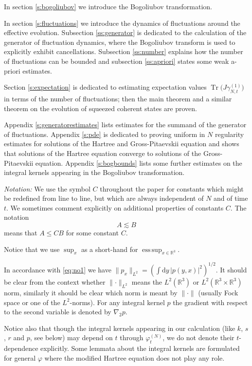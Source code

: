 \documentclass[11pt,a4paper,draft,DIV11]{scrartcl}	%
\newcommand{\di}{\textrm{d}}		%
\newcommand{\Rbb}{\mathbb{R}}		%
\newcommand{\norm}[1]{\lVert#1\rVert}	%
\newcommand{\ph}{\varphi_t^{(N)}}	%
\newcommand{\Tr}{\operatorname{Tr}}	%
\newcommand{\eqr}[1]{\eqref{eq:#1}}			%
\begin{document}
In section \ref{s:bogoliubov} we introduce the Bogoliubov transformation.

In section \ref{s:fluctuations} we introduce the dynamics of fluctuations around the effective evolution. Subsection \ref{ss:generator} is dedicated to the calculation of the generator of fluctuation dynamics, where the Bogoliubov transform is used to explicitly exhibit cancellations. Subsection \ref{ss:number} explains how the number of fluctuations can be bounded and subsection \ref{ss:apriori} states some weak a-priori estimates.

Section \ref{s:expectation} is dedicated to estimating expectation values $\Tr\big(J \gamma_{N,t}^{(1)}\big)$ in terms of the number of fluctuations; then the main theorem and a similar theorem on the evolution of squeezed coherent states are proven.

Appendix \ref{s:generatorestimates} lists estimates for the summand of the generator of fluctuations. Appendix \ref{s:pde} is dedicated to proving uniform in $N$ regularity estimates for solutions of the Hartree and Gross-Pitaevskii equation and shows that solutions of the Hartree equation converge to solutions of the Gross-Pitaevskii equation. Appendix \ref{s:bogbounds} lists some further estimates on the integral kernels appearing in the Bogoliubov transformation.
\newline

\emph{Notation:} We use the symbol $C$ throughout the paper for constants which might be redefined from line to line, but which are always independent of $N$ and of time $t$. We sometimes comment explicitly on additional properties of constants $C$.
The notation
\[
  A \apprle B
\]
means that $A \le C B$ for some constant $C$.

Notice that we use $\sup_x$ as a short-hand for $\operatorname{ess\,sup}_{x\in \Rbb^3}$.

In accordance with \eqr{no1} we have $\norm{p_x}_{L^2} = \left( \int \di y\,
\lvert p(y,x)\rvert^2 \right)^{1/2}$. It should be clear from the context
whether $\norm{\cdot}_{L^2}$ means the $L^2(\Rbb^3)$ or $L^2(\Rbb^3 \times \Rbb^3)$ norm, similarly it should be clear which norm is meant by $\norm{\cdot}$ (usually Fock space or one of the $L^2$-norms).
For any integral kernel $p$ the gradient with respect to the second variable is denoted by $\nabla_2 p$.

Notice also that though the integral kernels appearing in our calculation (like $k$, $s$, $r$ and $p$, see below) may depend on $t$ through $\ph$, we do not denote their $t$-dependence explicitly. Some lemmata about the integral kernels are formulated for general $\varphi$ where the modified Hartree equation does not play any role.
\end{document}
